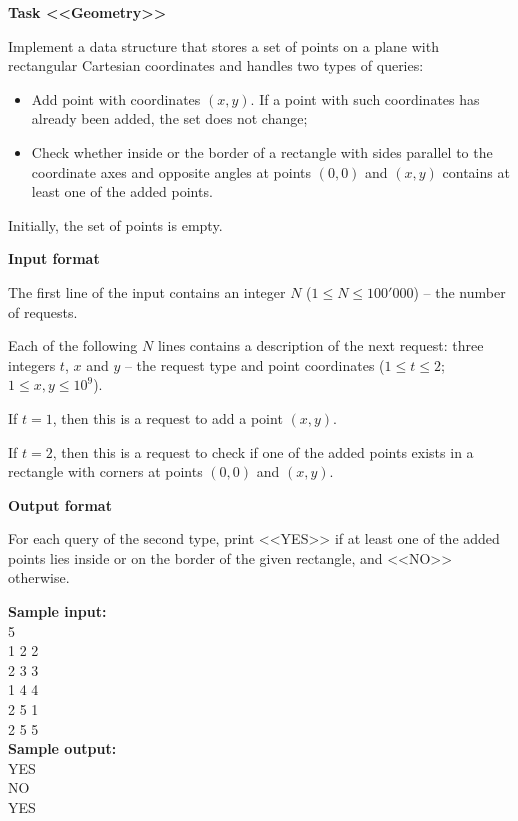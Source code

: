 \documentclass[a4paper]{article}
\begin{document}
\textbf{Task <<Geometry>>}

Implement a data structure that stores a set of points on a plane with rectangular Cartesian coordinates and handles two types of queries:
\begin{itemize}
\item Add point with coordinates $(x, y)$. If a point with such coordinates has already been added, the set does not change;
\item Check whether inside or the border of a rectangle with sides parallel to the coordinate axes and opposite angles at points $(0, 0)$ and $(x, y)$ contains at least one of the added points.
\end{itemize}

Initially, the set of points is empty.

\SPACE

\textbf{Input format}

The first line of the input contains an integer $N$ ($1 \le N \le 100'000$) -- the number of requests.

Each of the following $N$ lines contains a description of the next request: three integers $t$, $x$ and $y$ -- the request type and point coordinates ($1 \le t \le 2$; $1 \le x, y \le 10^9$).

If $t = 1$, then this is a request to add a point $(x, y)$.

If $t = 2$, then this is a request to check if one of the added points exists in a rectangle with corners at points $(0, 0)$ and $(x, y)$.

\SPACE

\textbf{Output format}

For each query of the second type, print <<YES>> if at least one of the added points lies inside or on the border of the given rectangle, and <<NO>> otherwise.

\LINE

\noindent \textbf{Sample input:}\\
5\\
1 2 2\\
2 3 3\\
1 4 4\\
2 5 1\\
2 5 5\\

\noindent \textbf{Sample output:}\\
YES\\
NO\\
YES\\
\end{document}
